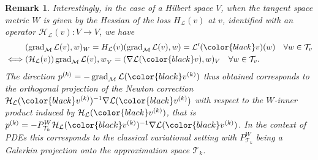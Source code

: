 \documentclass{article}
\theoremstyle{noparens}
\newtheorem{remark}{Remark}[section]
\newcommand{\cL}{\mathcal{L}}
\newcommand{\cT}{\mathcal{T}}
\newcommand{\cM}{\mathcal{M}}
\newcommand{\colorM}{\color{black}}
\renewcommand{\v}{{\colorM v}}
\newcommand{\vk}{{\colorM v^{(k)}}}
\newcommand{\gradM}{\operatorname{grad}_{\cM}}
\begin{document}
\begin{remark}
Interestingly, in the case of a Hilbert space $V$, when the tangent space metric $W$ is given by the Hessian of the loss $H_\cL(v)$ at $v$, identified with an operator $\mathcal{H}_\cL(v) : V \to V$, we have
\begin{align*}
&({\gradM \cL(v),w})_{W}  = H_\cL(v)({\gradM \cL(v), w})  = \cL'(\v)(w) \quad \forall w\in \cT_v \\
\iff& ({\mathcal{H}_\cL(v)) \gradM \cL(v) , w}_V = ({\nabla \cL(\v), w})_V \quad \forall w\in \cT_v.
\end{align*}
The direction $p^{(k)} = - \gradM \cL(\vk)$ thus obtained corresponds to the orthogonal projection of the Newton correction $\mathcal{H}_\cL(\vk)^{-1} \nabla  \cL(\vk) $ with respect to the $W$-inner product induced by $\mathcal{H}_\cL(\vk)$, that is  $p^{(k)}=- P_{\cT_k}^W \mathcal{H}_\cL(\vk)^{-1} \nabla  \cL(\vk) $.
In the context of PDEs this corresponds to the classical variational setting with $P^W_{\cT_k}$ being a Galerkin projection onto the approximation space $\cT_k$.
\end{remark}
\end{document}
